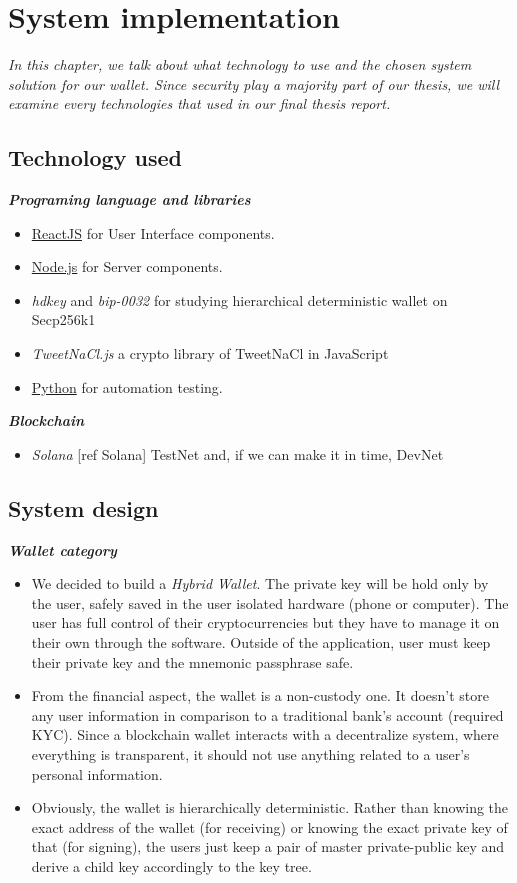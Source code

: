 \chapter{System implementation} \label{chap:System_implementation}
\textit{In this chapter, we talk about what technology to use and the chosen system solution for our wallet. Since security play a majority part of our thesis, we will examine every technologies that used in our final thesis report.}
\minitoc

\section{Technology used}
{\textit {\textbf{Programing language and libraries}}}
\begin{itemize}
\item \href{https://reactjs.org/}{ReactJS} for User Interface components. 
\item \href{https://nodejs.org/en/}{Node.js} for Server components.
\item \emph{hdkey} and \emph{bip-0032} for studying hierarchical deterministic wallet on Secp256k1
\item \emph{TweetNaCl.js} a crypto library of TweetNaCl in JavaScript
\item \href{https://www.python.org/}{Python} for automation testing.
\end{itemize}

{\textit {\textbf{Blockchain}}}
\begin{itemize}
    \item \emph{Solana} [ref Solana] TestNet and, if we can make it in time, DevNet
\end{itemize}

\section{System design}
{\textit {\textbf{Wallet category}}}
\begin{itemize}
    \item We decided to build a \emph{Hybrid Wallet}. The private key will be hold only by the user, safely saved in the user isolated hardware (phone or computer). The user has full control of their cryptocurrencies but they have to manage it on their own through the software. Outside of the application, user must keep their private key and the mnemonic passphrase safe.
    \item From the financial aspect, the wallet is a non-custody one. It doesn't store any user information in comparison to a traditional bank's account (required KYC). Since a blockchain wallet interacts with a decentralize system, where everything is transparent, it should not use anything related to a user's personal information.
    \item Obviously, the wallet is hierarchically deterministic. Rather than knowing the exact address of the wallet (for receiving) or knowing the exact private key of that (for signing), the users just keep a pair of master private-public key and derive a child key accordingly to the key tree.
\end{itemize}

